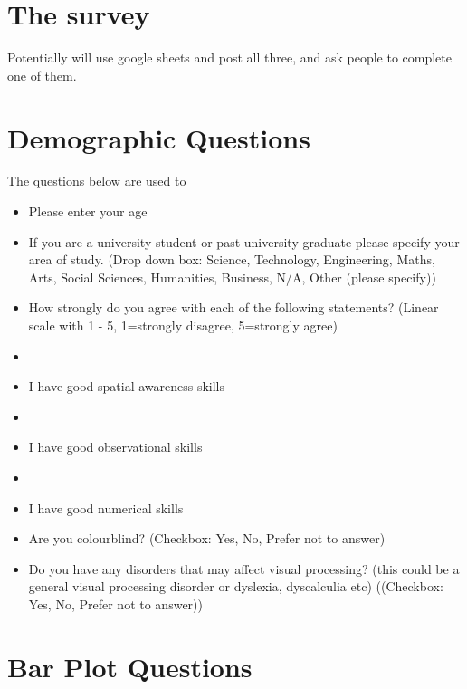 \section{The survey}

Potentially will use google sheets and post all three, and ask people to complete one of them.

\section{\textbf{Demographic Questions}}

The questions below are used to 

\begin{itemize}
    \item Please enter your age
    
    \item If you are a university student or past university graduate please specify your area of study. (Drop down box: Science, Technology, Engineering, Maths, Arts, Social Sciences, Humanities, Business, N/A, Other (please specify))

    \item How strongly do you agree with each of the following statements? (Linear scale with 1 - 5, 1=strongly disagree, 5=strongly agree)

    \item\item I have good spatial awareness skills 
    
    \item\item I have good observational skills 
    
    \item\item I have good numerical skills 
    
    \item Are you colourblind? (Checkbox: Yes, No, Prefer not to answer)
    
    \item Do you have any disorders that may affect visual processing? (this could be a general visual processing disorder 
    or dyslexia, dyscalculia etc)
    ((Checkbox: Yes, No, Prefer not to answer))
\end{itemize}


\section{\textbf{Bar Plot Questions}}

